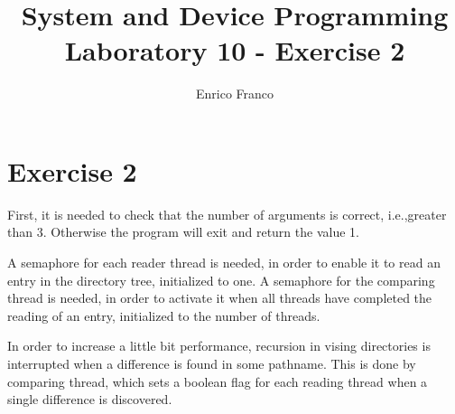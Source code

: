 \documentclass{report}
\author{Enrico Franco}
\title{System and Device Programming \\
	Laboratory 10 - Exercise 2}
\begin{document}
\section*{Exercise 2}

First, it is needed to check that the number of arguments is correct, i.e.,\@ greater than 3. Otherwise the program will exit and return the value 1.

A semaphore for each reader thread is needed, in order to enable it to read an entry in the directory tree, initialized to one. A semaphore for the comparing thread is needed, in order to activate it when all threads have completed the reading of an entry, initialized to the number of threads.

In order to increase a little bit performance, recursion in vising directories is interrupted when a difference is found in some pathname. This is done by comparing thread, which sets a boolean flag for each reading thread when a single difference is discovered.
\end{document}
